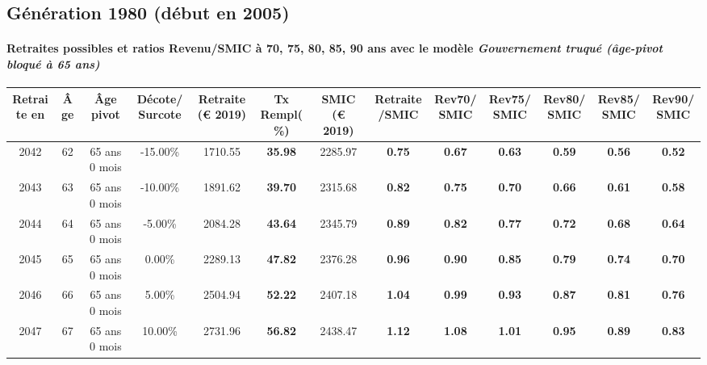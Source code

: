 \newpage 
 
\subsection{Génération 1980 (début en 2005)} 

\paragraph{Retraites possibles et ratios Revenu/SMIC à 70, 75, 80, 85, 90 ans avec le modèle \emph{Gouvernement truqué (âge-pivot bloqué à 65 ans)}}  
 
{ \scriptsize \begin{center} 
\begin{tabular}[htb]{|c|c||c|c||c|c||c||c|c|c|c|c|c|} 
\hline 
 Retraite en &  Âge &  Âge pivot &  Décote/Surcote &  Retraite (\euro{} 2019) &  Tx Rempl(\%) &  SMIC (\euro{} 2019) &  Retraite/SMIC &  Rev70/SMIC &  Rev75/SMIC &  Rev80/SMIC &  Rev85/SMIC &  Rev90/SMIC \\ 
\hline \hline 
 2042 &  62 &  65 ans 0 mois &  -15.00\% &  1710.55 &  {\bf 35.98} &  2285.97 &  {\bf {\color{red} 0.75}} &  {\bf {\color{red} 0.67}} &  {\bf {\color{red} 0.63}} &  {\bf {\color{red} 0.59}} &  {\bf {\color{red} 0.56}} &  {\bf {\color{red} 0.52}} \\ 
\hline 
 2043 &  63 &  65 ans 0 mois &  -10.00\% &  1891.62 &  {\bf 39.70} &  2315.68 &  {\bf {\color{red} 0.82}} &  {\bf {\color{red} 0.75}} &  {\bf {\color{red} 0.70}} &  {\bf {\color{red} 0.66}} &  {\bf {\color{red} 0.61}} &  {\bf {\color{red} 0.58}} \\ 
\hline 
 2044 &  64 &  65 ans 0 mois &  -5.00\% &  2084.28 &  {\bf 43.64} &  2345.79 &  {\bf {\color{red} 0.89}} &  {\bf {\color{red} 0.82}} &  {\bf {\color{red} 0.77}} &  {\bf {\color{red} 0.72}} &  {\bf {\color{red} 0.68}} &  {\bf {\color{red} 0.64}} \\ 
\hline 
 2045 &  65 &  65 ans 0 mois &  0.00\% &  2289.13 &  {\bf 47.82} &  2376.28 &  {\bf {\color{red} 0.96}} &  {\bf {\color{red} 0.90}} &  {\bf {\color{red} 0.85}} &  {\bf {\color{red} 0.79}} &  {\bf {\color{red} 0.74}} &  {\bf {\color{red} 0.70}} \\ 
\hline 
 2046 &  66 &  65 ans 0 mois &  5.00\% &  2504.94 &  {\bf 52.22} &  2407.18 &  {\bf 1.04} &  {\bf {\color{red} 0.99}} &  {\bf {\color{red} 0.93}} &  {\bf {\color{red} 0.87}} &  {\bf {\color{red} 0.81}} &  {\bf {\color{red} 0.76}} \\ 
\hline 
 2047 &  67 &  65 ans 0 mois &  10.00\% &  2731.96 &  {\bf 56.82} &  2438.47 &  {\bf 1.12} &  {\bf 1.08} &  {\bf 1.01} &  {\bf {\color{red} 0.95}} &  {\bf {\color{red} 0.89}} &  {\bf {\color{red} 0.83}} \\ 
\hline 
\hline 
\end{tabular} 
\end{center} } 
